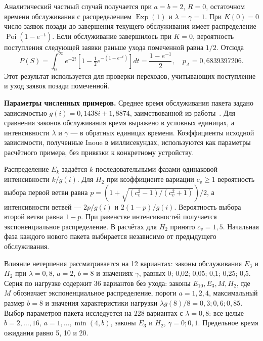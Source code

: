 Аналитический частный случай получается при $a=b=2$, $R=0$, остаточном времени обслуживания с распределением $\operatorname{Exp}(1)$ и $\lambda=\gamma=1$. При $K(0)=0$ число заявок позади до завершения текущего обслуживания имеет распределение $\operatorname{Poi}(1-e^{-t})$. Если обслуживание завершилось при $K=0$, вероятность поступления следующей заявки раньше ухода помеченной равна $1/2$. Отсюда
\begin{equation}
 P(S)=\int_0^\infty e^{-2t}\left[1-\tfrac12 e^{-(1-e^{-t})}\right]dt
 =\frac{1-e^{-1}}2,\quad p_A=0{,}6839397206.
\end{equation}
Этот результат используется для проверки переходов, учитывающих поступление и уход заявок позади помеченной.

\noindent\textbf{Параметры численных примеров.}
Среднее время обслуживания пакета задано зависимостью $g(i)=0{,}1438i+1{,}8874$, заимствованной из работы~\cite{inoue2021}. Для сравнения законов обслуживания время выражено в условных единицах, а интенсивности $\lambda$ и $\gamma$ --- в обратных единицах времени. Коэффициенты исходной зависимости, полученные Inoue в миллисекундах, используются как параметры расчётного примера, без привязки к конкретному устройству.

Распределение $E_k$ задаётся $k$ последовательными фазами одинаковой интенсивности $k/g(i)$. Для $H_2$ при коэффициенте вариации $c_v\geq1$ вероятность выбора первой ветви равна $p=(1+\sqrt{(c_v^2-1)/(c_v^2+1)})/2$, а интенсивности ветвей --- $2p/g(i)$ и $2(1-p)/g(i)$. Вероятность выбора второй ветви равна $1-p$. При равенстве интенсивностей получается экспоненциальное распределение. В расчётах для $H_2$ принято $c_v=1{,}5$. Начальная фаза каждого нового пакета выбирается независимо от предыдущего обслуживания.

Влияние нетерпения рассматривается на 12 вариантах: законы обслуживания $E_3$ и $H_2$ при $\lambda=0{,}8$, $a=2$, $b=8$ и значениях $\gamma$, равных 0; 0,02; 0,05; 0,1; 0,25; 0,5. Серия по нагрузке содержит 36 вариантов без ухода: законы $E_{10},E_3,M,H_2$, где $M$ обозначает экспоненциальное распределение, пороги $a=1,2,4$, максимальный размер $b=8$ и значения характеристики нагрузки $\lambda g(8)/8=0{,}3;0{,}6;0{,}85$. Выбор параметров пакета исследуется на 228 вариантах с $\lambda=0{,}8$: все целые $b=2,\ldots,16$, $a=1,\ldots,\min(4,b)$, законы $E_3$ и $H_2$, $\gamma=0;0{,}1$. Предельное время ожидания равно 5, 10 и 20.

